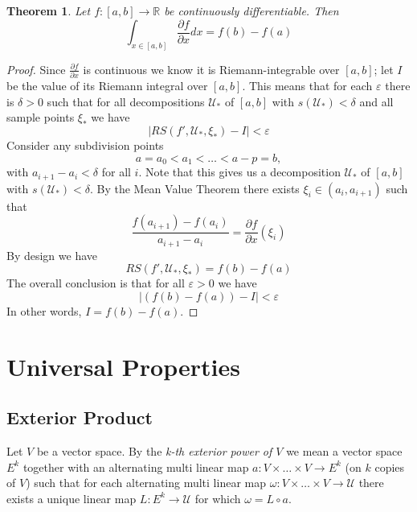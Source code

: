 \documentclass[12pt]{armath}
\newtheorem{theorem}{Theorem}[section]
\newcommand{\U}{\mathcal{U}}
\newcommand{\ra}{\rightarrow}
\newcommand{\R}{\mathbb{R}}
\newcommand{\e}{\varepsilon}
\newcommand{\de}{\delta}
\newcommand{\pder}[2]{\frac{\partial #1}{\partial #2}}
\begin{document}
  \begin{theorem}
    Let $f:[a,b]\ra\R$ be continuously differentiable. Then
    \[
      \int_{x\in[a,b]}\pder{f}{x}dx=f(b)-f(a)
    \]
  \end{theorem}
  \begin{proof}
    Since $\pder{f}{x}$ is continuous we know it is Riemann-integrable over
    $[a,b]$; let $I$ be the value of its Riemann integral over $[a,b]$. This
    means that for each $\e$ there is $\de>0$ such that for all decompositions
    $\U_*$ of $[a,b]$ with $s(\U_*)<\de$ and all sample points $\xi_*$ we have
    \[
      \left|RS(f',\U_*,\xi_*)-I\right|<\e
    \]
    Consider any subdivision points
    \[
      a=a_0<a_1<\ldots<a-p=b,
    \]
    with $a_{i+1}-a_i<\de$ for all $i$. Note that this gives us a decomposition
    $\U_*$ of $[a,b]$ with $s(\U_*)<\de$. By the Mean Value Theorem there exists
    $\xi_i\in(a_i,a_{i+1})$ such that
    \[
      \frac{f(a_{i+1})-f(a_i)}{a_{i+1}-a_i}=\pder{f}{x}(\xi_i)
    \]
    By design we have
    \[
      RS(f',\U_*,\xi_*)=f(b)-f(a)
    \]
    The overall conclusion is that for all $\e>0$ we have
    \[
      |(f(b)-f(a))-I|<\e
    \]
    In other words, $I=f(b)-f(a)$.
  \end{proof}

  \section{Universal Properties}%
  \label{sec:univresal_properties}

  \subsection{Exterior Product}%
  \label{sub:exterior_product}

  \begin{center}
  \end{center}

  Let $V$ be a vector space. By the \textit{k-th exterior power of $V$} we mean a
  vector space $E^k$ together with an alternating multi linear map
  $a:V\times\ldots\times V\ra E^k$ (on $k$ copies of $V$) such that for each
  alternating multi linear map $\omega:V\times\ldots\times V\ra \U$ there exists a
  unique linear map $L:E^k\ra \U$ for which $\omega=L\circ a$.
\end{document}
